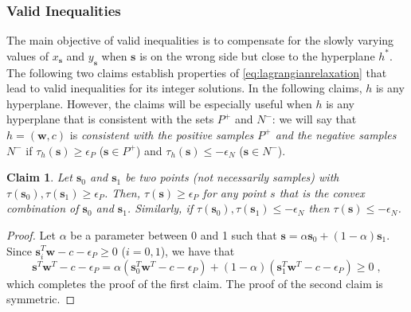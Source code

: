 \documentclass[11pt]{article}
\newtheorem{claim}{Claim}[section]
\theoremstyle{definition}
\newcommand{\vect}[1]{\mathbf{#1}}
\newcommand{\sv}[1]{_{\vect{#1}}}
\begin{document}
\iffalse
\subsubsection{Valid Inequalities}
The main objective of valid inequalities is to compensate for the 
slowly varying values of $x\sv{s}$ and $y\sv{s}$ when $\vect{s}$ is 
on the wrong side but close to the hyperplane $h^*$.
The following two claims establish properties of 
\eqref{eq:lagrangianrelaxation} that lead to valid inequalities
for its integer solutions.
In the following claims, $h$ is any hyperplane.
However, the claims will be especially useful when $h$ is any hyperplane that
is consistent with the sets $P^+$ and $N^-$: we will say
that $h = (\vect{w}, c)$ is 
{\em consistent with the positive samples $P^+$ and the negative samples $N^-$\/}
if $\tau_h(\vect{s}) \geq \epsilon_P$ ($\vect{s} \in P^+$) and
$\tau_h(\vect{s}) \leq - \epsilon_N$ ($\vect{s} \in N^-$).
\begin{claim}
\label{claim:convexhull}
Let $\vect{s}_0$ and $\vect{s}_1$ be two points (not necessarily samples)
with $\tau(\vect{s}_0), \tau(\vect{s}_1) \geq \epsilon_P$.
Then, $\tau(\vect{s}) \geq \epsilon_P$
for any point $s$
that is the convex combination of $\vect{s}_0$ and $\vect{s}_1$.
Similarly, if $\tau(\vect{s}_0), \tau(\vect{s}_1) \leq -\epsilon_N$
then $\tau(\vect{s}) \leq - \epsilon_N$.
\end{claim}
\begin{proof}
Let $\alpha$ be a parameter between 0 and 1 such that
$\vect{s} = \alpha \vect{s}_0 + (1 - \alpha) \vect{s}_1$.
Since 
$\vect{s}_i^T \vect{w} - c - \epsilon_P \geq 0$ ($i = 0, 1$),
we have that
$$\vect{s}^T \vect{w}^T - c - \epsilon_P =
\alpha (\vect{s}_0^T \vect{w}^T - c - \epsilon_P) +
(1 - \alpha) (\vect{s}_1^T \vect{w}^T - c - \epsilon_P) \geq 0\;,$$
which completes the proof of the first claim.
The proof of the second claim is symmetric.
\end{proof}
\end{document}
